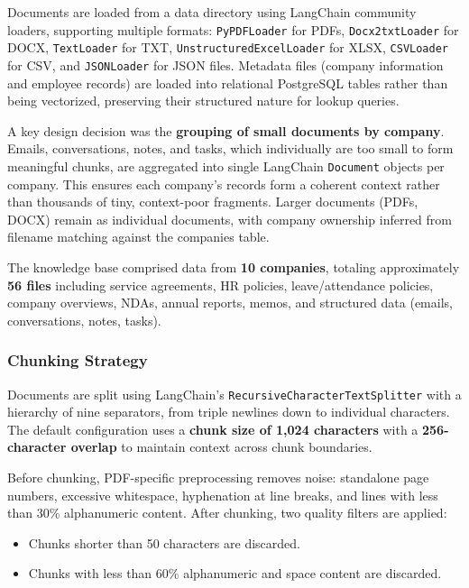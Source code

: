 Documents are loaded from a data directory using LangChain community loaders, supporting multiple formats: \texttt{PyPDFLoader} for PDFs, \texttt{Docx2txtLoader} for DOCX, \texttt{TextLoader} for TXT, \texttt{UnstructuredExcelLoader} for XLSX, \texttt{CSVLoader} for CSV, and \texttt{JSONLoader} for JSON files. Metadata files (company information and employee records) are loaded into relational PostgreSQL tables rather than being vectorized, preserving their structured nature for lookup queries.

A key design decision was the \textbf{grouping of small documents by company}. Emails, conversations, notes, and tasks, which individually are too small to form meaningful chunks, are aggregated into single LangChain \texttt{Document} objects per company. This ensures each company's records form a coherent context rather than thousands of tiny, context-poor fragments. Larger documents (PDFs, DOCX) remain as individual documents, with company ownership inferred from filename matching against the companies table.

The knowledge base comprised data from \textbf{10 companies}, totaling approximately \textbf{56 files} including service agreements, HR policies, leave/attendance policies, company overviews, NDAs, annual reports, memos, and structured data (emails, conversations, notes, tasks).

\subsubsection{Chunking Strategy}

Documents are split using LangChain's \texttt{RecursiveCharacterTextSplitter} with a hierarchy of nine separators, from triple newlines down to individual characters. The default configuration uses a \textbf{chunk size of 1,024 characters} with a \textbf{256-character overlap} to maintain context across chunk boundaries.

Before chunking, PDF-specific preprocessing removes noise: standalone page numbers, excessive whitespace, hyphenation at line breaks, and lines with less than 30\% alphanumeric content. After chunking, two quality filters are applied:

\begin{itemize}
    \item Chunks shorter than 50 characters are discarded.
    \item Chunks with less than 60\% alphanumeric and space content are discarded.
\end{itemize}

